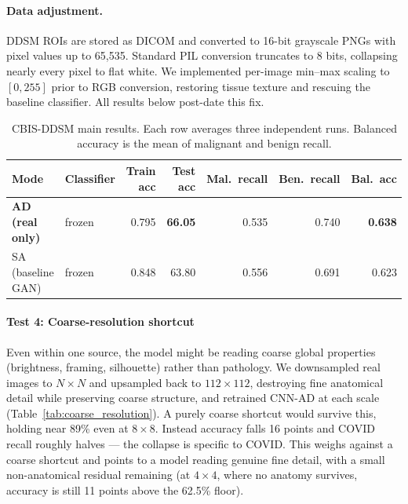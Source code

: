 \documentclass[11pt]{article}
\begin{document}
\paragraph{Data adjustment.} DDSM ROIs are stored as DICOM and converted to 16-bit grayscale PNGs with
pixel values up to 65,535. Standard PIL conversion truncates to 8 bits, collapsing nearly every pixel
to flat white. We implemented per-image min--max scaling to $[0,255]$ prior to RGB conversion,
restoring tissue texture and rescuing the baseline classifier. All results below post-date this fix.

\begin{table}[htbp]
\centering
\caption{CBIS-DDSM main results. Each row averages three independent runs. Balanced accuracy is the
mean of malignant and benign recall.}
\label{tab:ddsm_main}
\begin{tabular}{llrrrrr}
\toprule
\textbf{Mode} & \textbf{Classifier} & \textbf{Train acc} & \textbf{Test acc} &
\textbf{Mal.\ recall} & \textbf{Ben.\ recall} & \textbf{Bal.\ acc} \\
\midrule
\textbf{AD (real only)} & frozen & 0.795 & \textbf{66.05} & 0.535 & 0.740 & \textbf{0.638} \\
SA (baseline GAN) & frozen & 0.848 & 63.80 & 0.556 & 0.691 & 0.623 \\

\bottomrule
\end{tabular}
\end{table}

\paragraph{Test 4: Coarse-resolution shortcut}
Even within one source, the model might be reading coarse global properties (brightness, framing, silhouette) rather than pathology. We downsampled real images to $N \times N$ and upsampled back to $112 \times 112$, destroying fine anatomical detail while preserving coarse structure, and retrained CNN-AD at each scale (Table~\ref{tab:coarse_resolution}). A purely coarse shortcut would survive this, holding near 89\% even at $8 \times 8$. Instead accuracy falls 16 points and COVID recall roughly halves --- the collapse is specific to COVID. This weighs against a coarse shortcut and points to a model reading genuine fine detail, with a small non-anatomical residual remaining (at $4 \times 4$, where no anatomy survives, accuracy is still 11 points above the 62.5\% floor).
\end{document}
